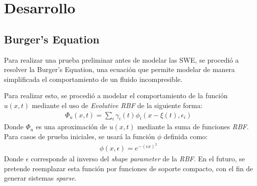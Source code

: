 \documentclass[spanish, fleqn]{article}
\begin{document}
\section{Desarrollo}
  \subsection{Burger's Equation}
    Para realizar una prueba preliminar antes de modelar las SWE, se procedió a resolver la Burger's Equation, una ecuación que 
    permite modelar de manera simplificada el comportamiento de un fluido incompresible.
    
    Para realizar esto, se procedió a modelar el comportamiento de la función $u(x,t)$ mediante el uso de 
    \textit{Evolutive RBF} de la siguiente forma:
    \begin{align*}
      \Phi_u(x,t) = \sum_i \gamma_i(t)\phi_i(x-\xi(t),\epsilon_i)
    \end{align*}
    Donde $\Phi_u$ es una aproximación de $u(x,t)$ mediante la suma de funciones \textit{RBF}. Para casos de prueba iniciales, 
    se usará la función $\phi$ definida como:
    \begin{align*}
      \phi(x,\epsilon) = e^{-(\epsilon x)^2}
    \end{align*}
    Donde $\epsilon$ corresponde al inverso del \textit{shape parameter} de la \textit{RBF}. En el futuro, se pretende 
    reemplazar esta función por funciones de soporte compacto, con el fin de generar sistemas \textit{sparse}.
    
\end{document}
